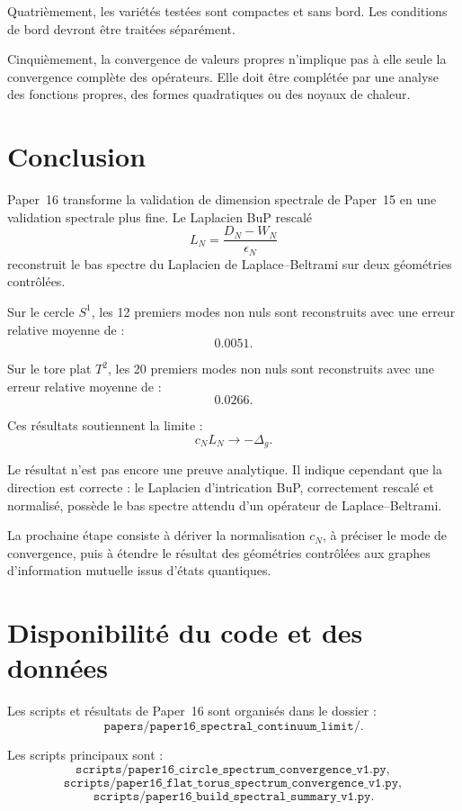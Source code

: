 \documentclass[11pt,a4paper]{article}
\begin{document}
Quatrièmement, les variétés testées sont compactes et sans bord. Les
conditions de bord devront être traitées séparément.

Cinquièmement, la convergence de valeurs propres n'implique pas à elle seule
la convergence complète des opérateurs. Elle doit être complétée par une
analyse des fonctions propres, des formes quadratiques ou des noyaux de
chaleur.

\section{Conclusion}

Paper~16 transforme la validation de dimension spectrale de Paper~15 en une
validation spectrale plus fine. Le Laplacien BuP rescalé
\[
L_N=\frac{D_N-W_N}{\epsilon_N}
\]
reconstruit le bas spectre du Laplacien de Laplace--Beltrami sur deux
géométries contrôlées.

Sur le cercle \(S^1\), les 12 premiers modes non nuls sont reconstruits avec
une erreur relative moyenne de :
\[
0.0051.
\]

Sur le tore plat \(T^2\), les 20 premiers modes non nuls sont reconstruits
avec une erreur relative moyenne de :
\[
0.0266.
\]

Ces résultats soutiennent la limite :
\[
c_NL_N
\longrightarrow
-\Delta_g.
\]

Le résultat n'est pas encore une preuve analytique. Il indique cependant que
la direction est correcte : le Laplacien d'intrication BuP, correctement
rescalé et normalisé, possède le bas spectre attendu d'un opérateur de
Laplace--Beltrami.

La prochaine étape consiste à dériver la normalisation \(c_N\), à préciser le
mode de convergence, puis à étendre le résultat des géométries contrôlées aux
graphes d'information mutuelle issus d'états quantiques.

\section*{Disponibilité du code et des données}

Les scripts et résultats de Paper~16 sont organisés dans le dossier :
\[
\texttt{papers/paper16\_spectral\_continuum\_limit/}.
\]

Les scripts principaux sont :
\[
\texttt{scripts/paper16\_circle\_spectrum\_convergence\_v1.py},
\]
\[
\texttt{scripts/paper16\_flat\_torus\_spectrum\_convergence\_v1.py},
\]
\[
\texttt{scripts/paper16\_build\_spectral\_summary\_v1.py}.
\]
\end{document}
